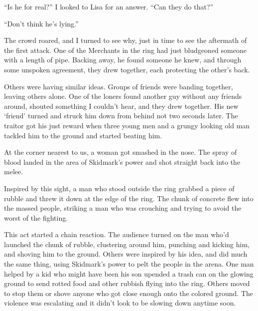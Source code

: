 





``Is he for real?'' I looked to Lisa for an answer.  ``Can they do that?''



``Don't think he's lying.''



The crowd roared, and I turned to see why, just in time to see the aftermath of the first attack.  One of the Merchants in the ring had just bludgeoned someone with a length of pipe.  Backing away, he found someone he knew, and through some unspoken agreement, they drew together, each protecting the other's back.



Others were having similar ideas.  Groups of friends were banding together, leaving others alone.  One of the loners found another guy without any friends around, shouted something I couldn't hear, and they drew together.  His new `friend' turned and struck him down from behind not two seconds later.  The traitor got his just reward when three young men and a grungy looking old man tackled him to the ground and started beating him.



At the corner nearest to us, a woman got smashed in the nose.  The spray of blood landed in the area of Skidmark's power and shot straight back into the melee.



Inspired by this sight, a man who stood outside the ring grabbed a piece of rubble and threw it down at the edge of the ring.  The chunk of concrete flew into the massed people, striking a man who was crouching and trying to avoid the worst of the fighting.



This act started a chain reaction.  The audience turned on the man who'd launched the chunk of rubble, clustering around him, punching and kicking him, and shoving him to the ground.  Others were inspired by his idea, and did much the same thing, using Skidmark's power to pelt the people in the arena.  One man helped by a kid who might have been his son upended a trash can on the glowing ground to send rotted food and other rubbish flying into the ring.  Others moved to stop them or shove anyone who got close enough onto the colored ground.  The violence was escalating and it didn't look to be slowing down anytime soon.



